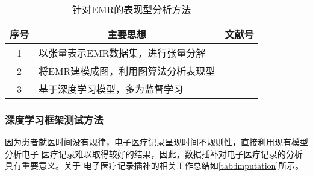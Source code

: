 \begin{table}
    \renewcommand\arraystretch{1.5}
    \begin{small}
        \caption{针对EMR的表现型分析方法}
        \label{tab:phenotype}
        \begin{center}
            \begin{tabular}[c]{cll}
                \toprule
                \multicolumn{1}{c}{\textbf{序号}} &
                \multicolumn{1}{c}{\textbf{主要思想}} &
                \multicolumn{1}{c}{\textbf{文献号}}\\
                \midrule
                1 & 以张量表示EMR数据集，进行张量分解 &
                \cite{ho2014extracting} \cite{kim2017federated}
                \cite{perros2018sustain} \cite{heano2018parallel} \cite{he2019distributed}
                \cite{perros2019temporal} \\
                2 & 将EMR建模成图，利用图算法分析表现型 & \cite{liu2015temporal}
                \cite{wang2015graph} \cite{xu2017predicting} \\
                3 & 基于深度学习模型，多为监督学习 & \cite{kale2015causal}
                \cite{che2015deep}
                \cite{beaulieu2016semi} \cite{cheng2016risk}
                \cite{baytas2017patient} \cite{fu2019ddl} \cite{seymour2019derivation} \\
               \bottomrule
            \end{tabular}
        \end{center}
    \end{small}
\end{table}

{}

\subsubsection{深度学习框架测试方法}

因为患者就医时间没有规律，电子医疗记录呈现时间不规则性，直接利用现有模型分析电子
医疗记录难以取得较好的结果，因此，数据插补对电子医疗记录的分析具有重要意义。关于
电子医疗记录插补的相关工作总结如\cref{tab:imputation}所示。

